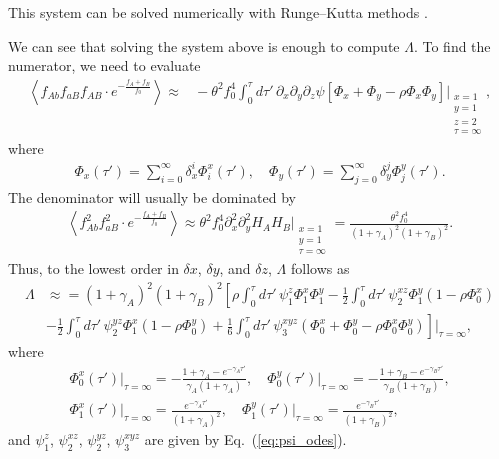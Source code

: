 \documentclass[aps,rmp,twocolumn,groupedaddress,floatfix,notitlepage]{revtex4-1}
\begin{document}
This system can be solved numerically with Runge–Kutta methods \parencite{dormand_prince_1980}.

We can see that solving the system above is enough to compute $\Lambda$. To find the numerator, we need to evaluate 
\begin{align}\label{eq:num_lambda_unperturbed}
    \left\langle f_{Ab}f_{aB}f_{AB}\cdot e^{-\frac{f_{A}+f_{B}}{f_0}}\right\rangle \approx&{} 
    -\theta^2 f_0^4 \int_0^{\tau} d\tau'\, \partial_x\partial_y\partial_z \psi \left[\Phi_x + \Phi_y -\rho \Phi_x\Phi_y\right]\Bigg\vert_{\substack{x=1 \\ y=1 \\ z=2 \\ \tau=\infty}},
\end{align}
where    \begin{align}\label{eq:phi_x_y_expansion_full_neutral}
        \Phi_x(\tau') = \sum_{i=0}^{\infty} \delta^i_x \Phi^x_i (\tau'), \quad 
        \Phi_y(\tau') = \sum_{j=0}^{\infty} \delta^j_y \Phi^y_j (\tau').
    \end{align}
The denominator will usually be dominated by 
\begin{align}\label{eq:lambda_num_neutral}
    \left\langle f_{Ab}^2 f_{aB}^2 \cdot e^{-\frac{f_A + f_B}{f_0}}\right\rangle \approx \theta^2 f_0^4 \partial_x^2 \partial_y^2 H_A H_B \Bigg\vert_{\substack{x=1 \\ y=1 \\ \tau=\infty}} =  \frac{\theta^2 f_0^4}{(1+\gamma_A)^2(1+\gamma_B)^2}.
\end{align}
Thus, to the lowest order in $\delta x$, $\delta y$, and $\delta z$, $\Lambda$ follows as
\begin{align}\label{eq:num_lambda_perturbed}
    \Lambda & \approx{} 
     =(1+\gamma_A)^2(1+\gamma_B)^2\left[ \rho \int_0^{\tau} d\tau'\, \psi_1^z \Phi_1^x \Phi_1^y - \frac{1}{2} \int_0^{\tau} d\tau'\, \psi_2^{xz} \Phi_1^y \left(1-\rho \Phi_0^x\right) \right. \\ \nonumber
    & - \frac{1}{2} \left. \int_0^{\tau} d\tau'\, \psi_2^{yz} \Phi_1^x \left(1-\rho \Phi_0^y\right) + \frac{1}{6} \int_0^{\tau} d\tau'\,  \psi_3^{xyz} (\Phi_0^x + \Phi_0^y -\rho \Phi_0^x\Phi_0^y)
    \right]\Bigg\vert_{\tau=\infty},
\end{align}
where 
\begin{subequations}
    \begin{gather}
        \Phi_0^x(\tau') \Bigg\vert_{\tau=\infty} = -\frac{1+\gamma_A-e^{-\gamma_A\tau'}}{\gamma_A(1+\gamma_A)}, \quad \Phi_0^y(\tau') \Bigg\vert_{\tau=\infty} = -\frac{1+\gamma_B-e^{-\gamma_B\tau'}}{\gamma_B(1+\gamma_B)}, \\
        \Phi_1^x(\tau') \Bigg\vert_{\tau=\infty} = \frac{e^{-\gamma_A\tau'}}{(1+\gamma_A)^2}, \quad \Phi_1^y(\tau') \Bigg\vert_{\tau=\infty} = \frac{e^{-\gamma_B\tau'}}{(1+\gamma_B)^2},
    \end{gather}
\end{subequations}
and $\psi_1^z$, $\psi_2^{xz}$, $\psi_2^{yz}$, $\psi_3^{xyz}$ are given by Eq.~(\ref{eq:psi_odes}).
\end{document}
